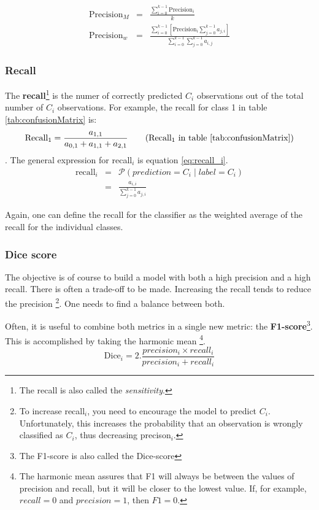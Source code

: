 \begin{eqnarray}
    \text{Precision}_M &=& \frac{\sum_{i=0}^{k-1} \text{Precision}_i}{k}  \\
    \text{Precision}_w &=& \frac{\sum_{i=0}^{k-1} \left[ \text{Precision}_i \sum_{j=0}^{k-1} a_{j,i} \right] }{\sum_{i=0}^{k-1} \sum_{j=0}^{k-1} a_{i,j} }  
\end{eqnarray}


\subsubsection{Recall}

The \textbf{recall}\footnote{The recall is also called the \textit{sensitivity}.} is the numer of correctly predicted $C_i$ observations out of the total number of $C_i$ observations.
For example, the recall for class 1 in table \ref{tab:confusionMatrix} is:
\begin{equation}
    \text{Recall}_1 = \frac{a_{1,1}}{a_{0,1} + a_{1,1} + a_{2, 1}} \tag{Recall$_1$ in table \ref{tab:confusionMatrix}}
\end{equation}.
The general expression for recall$_i$ is equation \ref{eq:recall_i}.
\begin{eqnarray}
    \text{recall}_i &=& \mathcal{P} \left( prediction = C_i \mid label = C_i \right) \\
    &=& \frac{a_{i, i}}{\sum_{j=0}^{k-1} a_{j, i}} \label{eq:recall_i}
\end{eqnarray}

Again, one can define the recall for the classifier as the weighted average of the recall for the individual classes.

\subsubsection{Dice score}

The objective is of course to build a model with both a high precision and a high recall.
There is often a trade-off to be made. 
Increasing the recall tends to reduce the precision
\footnote{To increase recall$_i$, you need to encourage the model to predict $C_i$. Unfortunately, this increases the probability that an observation is wrongly classified as $C_i$, thus decreasing precison$_i$.}.
One needs to find a balance between both.

Often, it is useful to combine both metrics in a single new metric: the \textbf{F1-score}\footnote{The F1-score is also called the Dice-score}. This is accomplished by taking the harmonic mean
\footnote{The harmonic mean assures that F1 will always be between the values of precision and recall, but it will be closer to the lowest value. If, for example, $recall=0$ and $precision=1$, then $F1=0$.}.
\begin{equation}
    \text{Dice}_i = 2 . \frac{precision_i \times recall_i }{precision_i + recall_i }
\end{equation}

